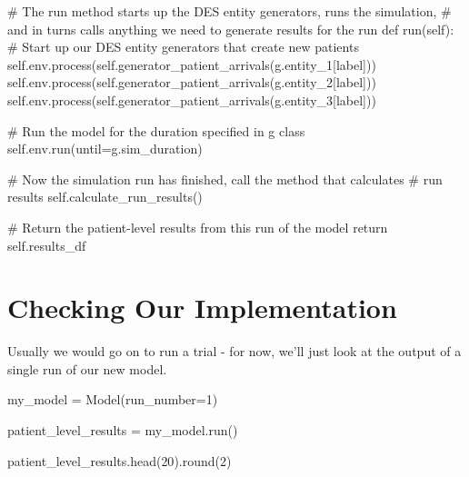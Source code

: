 \documentclass[
  letterpaper,
  DIV=11,
  numbers=noendperiod]{scrreprt}
\newenvironment{Shaded}{}{}
\newcommand{\BuiltInTok}[1]{\textcolor[rgb]{0.84,0.23,0.29}{#1}}
\newcommand{\CommentTok}[1]{\textcolor[rgb]{0.42,0.45,0.49}{#1}}
\newcommand{\ControlFlowTok}[1]{\textcolor[rgb]{0.84,0.23,0.29}{#1}}
\newcommand{\DecValTok}[1]{\textcolor[rgb]{0.00,0.36,0.77}{#1}}
\newcommand{\KeywordTok}[1]{\textcolor[rgb]{0.84,0.23,0.29}{#1}}
\newcommand{\NormalTok}[1]{\textcolor[rgb]{0.14,0.16,0.18}{#1}}
\newcommand{\OperatorTok}[1]{\textcolor[rgb]{0.14,0.16,0.18}{#1}}
\newcommand{\StringTok}[1]{\textcolor[rgb]{0.01,0.18,0.38}{#1}}
\newcommand{\VariableTok}[1]{\textcolor[rgb]{0.89,0.38,0.04}{#1}}
\begin{document}
\begin{tcolorbox}
\begin{Shaded}
\begin{Highlighting}[]
    \CommentTok{\# The run method starts up the DES entity generators, runs the simulation,}
    \CommentTok{\# and in turns calls anything we need to generate results for the run}
    \KeywordTok{def}\NormalTok{ run(}\VariableTok{self}\NormalTok{):}
        \CommentTok{\# Start up our DES entity generators that create new patients}
        \VariableTok{self}\NormalTok{.env.process(}\VariableTok{self}\NormalTok{.generator\_patient\_arrivals(g.entity\_1[}\StringTok{\textquotesingle{}label\textquotesingle{}}\NormalTok{]))}
        \VariableTok{self}\NormalTok{.env.process(}\VariableTok{self}\NormalTok{.generator\_patient\_arrivals(g.entity\_2[}\StringTok{\textquotesingle{}label\textquotesingle{}}\NormalTok{]))}
        \VariableTok{self}\NormalTok{.env.process(}\VariableTok{self}\NormalTok{.generator\_patient\_arrivals(g.entity\_3[}\StringTok{\textquotesingle{}label\textquotesingle{}}\NormalTok{]))}

        \CommentTok{\# Run the model for the duration specified in g class}
        \VariableTok{self}\NormalTok{.env.run(until}\OperatorTok{=}\NormalTok{g.sim\_duration)}

        \CommentTok{\# Now the simulation run has finished, call the method that calculates}
        \CommentTok{\# run results}
        \VariableTok{self}\NormalTok{.calculate\_run\_results()}

        \CommentTok{\# Return the patient{-}level results from this run of the model}
        \ControlFlowTok{return} \VariableTok{self}\NormalTok{.results\_df}
\end{Highlighting}
\end{Shaded}

\end{tcolorbox}

\section{Checking Our Implementation}\label{checking-our-implementation}

Usually we would go on to run a trial - for now, we'll just look at the
output of a single run of our new model.

\begin{Shaded}
\begin{Highlighting}[]
\NormalTok{my\_model }\OperatorTok{=}\NormalTok{ Model(run\_number}\OperatorTok{=}\DecValTok{1}\NormalTok{)}

\NormalTok{patient\_level\_results }\OperatorTok{=}\NormalTok{ my\_model.run()}

\NormalTok{patient\_level\_results.head(}\DecValTok{20}\NormalTok{).}\BuiltInTok{round}\NormalTok{(}\DecValTok{2}\NormalTok{)}
\end{Highlighting}
\end{Shaded}
\end{document}
